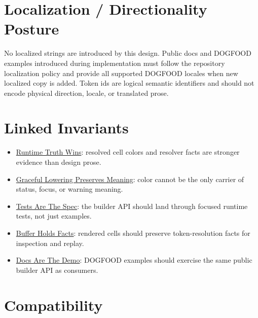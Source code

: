 \section{Localization / Directionality Posture}\label{record-178-localization-directionality-posture}

No localized strings are introduced by this design. Public docs and DOGFOOD examples introduced during implementation must follow the repository localization policy and provide all supported DOGFOOD locales when new localized copy is added. Token ids are logical semantic identifiers and should not encode physical direction, locale, or translated prose.

\section{Linked Invariants}\label{record-178-linked-invariants}

\begin{itemize}
\tightlist
\item
  \href{https://github.com/flyingrobots/bijou/blob/cbd70612140e7a450d764b3c7be1c6af878b99bc/docs/invariants/runtime-truth-wins.md}{Runtime Truth Wins}: resolved cell colors and resolver facts are stronger evidence than design prose.
\item
  \href{https://github.com/flyingrobots/bijou/blob/cbd70612140e7a450d764b3c7be1c6af878b99bc/docs/invariants/graceful-lowering-preserves-meaning.md}{Graceful Lowering Preserves Meaning}: color cannot be the only carrier of status, focus, or warning meaning.
\item
  \href{https://github.com/flyingrobots/bijou/blob/cbd70612140e7a450d764b3c7be1c6af878b99bc/docs/invariants/tests-are-the-spec.md}{Tests Are The Spec}: the builder API should land through focused runtime tests, not just examples.
\item
  \href{https://github.com/flyingrobots/bijou/blob/cbd70612140e7a450d764b3c7be1c6af878b99bc/docs/invariants/buffer-holds-facts.md}{Buffer Holds Facts}: rendered cells should preserve token-resolution facts for inspection and replay.
\item
  \href{https://github.com/flyingrobots/bijou/blob/cbd70612140e7a450d764b3c7be1c6af878b99bc/docs/invariants/docs-are-the-demo.md}{Docs Are The Demo}: DOGFOOD examples should exercise the same public builder API as consumers.
\end{itemize}

\section{Compatibility}\label{record-178-compatibility}

